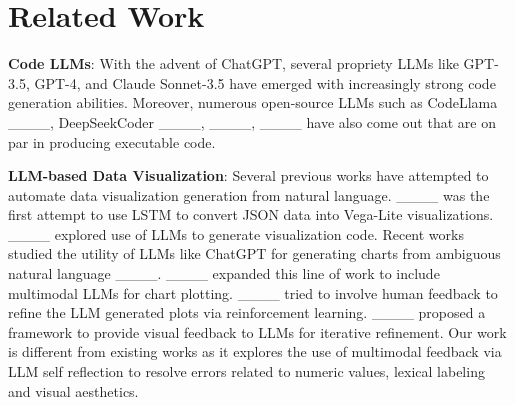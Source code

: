 \section{Related Work}

\noindent\textbf{Code LLMs}: With the advent of ChatGPT, several propriety LLMs like GPT-3.5, GPT-4, and Claude Sonnet-3.5 have emerged with increasingly strong code generation abilities. Moreover, numerous open-source LLMs such as CodeLlama ____, DeepSeekCoder ____, ____, ____ have also come out that are on par in producing executable code. 


\noindent\textbf{LLM-based Data Visualization}: Several previous works have attempted to automate data visualization generation from natural language. ____ was the first attempt to use LSTM to convert JSON data into Vega-Lite visualizations. ____ explored use of LLMs to generate visualization code. Recent works studied the utility of LLMs like ChatGPT for generating charts from ambiguous natural language  ____. ____ expanded this line of work to include multimodal LLMs for chart plotting. ____ tried to involve human feedback to refine the LLM generated plots via reinforcement learning. ____ proposed a framework to provide visual feedback to LLMs for iterative refinement. Our work is different from existing works as it explores the use of multimodal feedback via LLM self reflection to resolve errors related to numeric values, lexical labeling and visual aesthetics.




